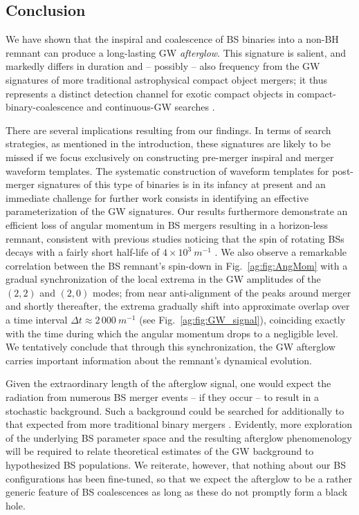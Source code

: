 \subsection{Conclusion}\label{ag:sec:conclusion}


We have shown that the inspiral and
coalescence of BS binaries into a non-BH remnant can produce a long-lasting GW {\it afterglow}. This signature is salient, and markedly differs in duration and -- possibly -- also
frequency from the GW signatures of more traditional astrophysical compact object mergers; it thus represents a distinct detection channel for exotic compact objects
in compact-binary-coalescence and continuous-GW searches \cite{LIGOScientific:2019yhl,KAGRA:2021una,LIGOScientific:2021jlr,LIGOScientific:2021oez,LIGOScientific:2022lsr,LIGOScientific:2022pjk,LIGOScientific:2021hvc,LIGOScientific:2021ozr}.

There are several implications resulting from our
findings. In terms of search strategies, as mentioned in the introduction, these signatures are likely to be missed if we focus exclusively on constructing pre-merger inspiral and merger waveform templates. The systematic construction of waveform templates for post-merger signatures of this type of binaries
is in its infancy at present and an immediate challenge
for further work consists in identifying an effective
parameterization of the GW signatures. Our results furthermore
demonstrate an efficient loss of angular momentum in BS mergers
resulting in a horizon-less remnant, consistent with previous studies noticing that the spin of rotating BSs decays with a fairly short half-life of $4\times 10^3~m^{-1}$ \cite{Sanchis-Gual:2019ljs}. We also observe
a remarkable correlation between the BS remnant's spin-down
in Fig.~\ref{ag:fig:AngMom} with a gradual synchronization
of the local extrema in the GW amplitudes of the $(2,2)$
and $(2,0)$ modes; from near anti-alignment of the
peaks around merger and shortly thereafter, the extrema
gradually shift into approximate overlap over a time
interval $\Delta t \approx 2\,000~m^{-1}$ (see
Fig.~\ref{ag:fig:GW_signal}), coinciding
exactly with the time during which the angular momentum
drops to a negligible level.
We tentatively conclude that through this synchronization,
the GW afterglow carries important information about the remnant's dynamical evolution. 

Given the extraordinary length of the afterglow signal, one
would expect the radiation from numerous BS merger events
-- if they occur -- to result in a stochastic background.
Such a background could be searched for additionally
to that expected from more traditional binary mergers
\cite{Croon:2018ftb}. Evidently, more exploration of the
underlying BS parameter space and the resulting afterglow
phenomenology will be required to relate theoretical
estimates of the GW background to hypothesized BS populations.
We reiterate, however, that nothing about our BS configurations
has been fine-tuned, so that we expect the afterglow to be a
rather generic feature of BS coalescences as long as these do 
not promptly form a black hole.


